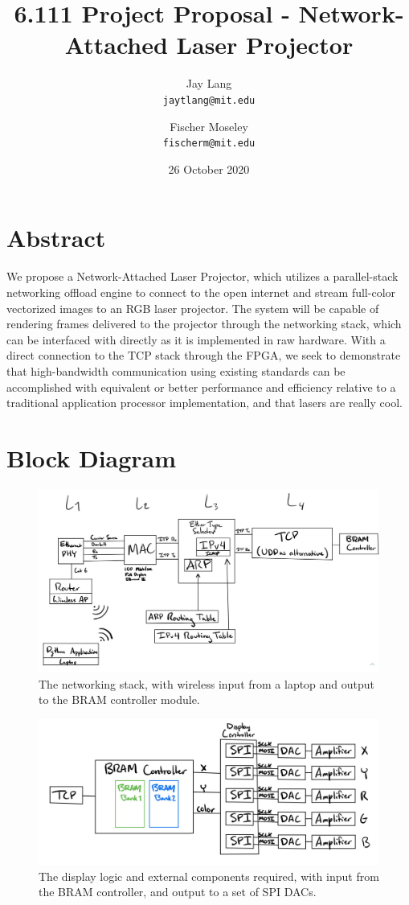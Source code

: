 \documentclass[11pt]{article}
\title{6.111 Project Proposal - Network-Attached Laser Projector}
\author{
  Jay Lang\\
  \texttt{jaytlang@mit.edu}
  \and
  Fischer Moseley\\
  \texttt{fischerm@mit.edu}
}
\date{26 October 2020}
\begin{document}
\maketitle

\section{Abstract}
We propose a Network-Attached Laser Projector, which utilizes
a parallel-stack networking offload engine to connect to the
open internet and stream full-color vectorized images to an RGB
laser projector. The system will be capable of rendering
frames delivered to the projector through the networking stack,
which can be interfaced with directly as it is implemented in
raw hardware. With a direct connection to the TCP stack through the FPGA, we seek to demonstrate that high-bandwidth communication using existing standards can be accomplished with equivalent or better performance and efficiency relative to a traditional application processor implementation, and that lasers are really cool.

\section{Block Diagram}
\begin{figure}[H]
\centering
\includegraphics[width=1\textwidth]{network.jpg}
\caption{The networking stack, with wireless input from a laptop and output to the BRAM controller module.}
\end{figure}

\begin{figure}[H]
\centering
\includegraphics[width=1\textwidth]{laser.jpg}
\caption{The display logic and external components required, with input from the BRAM controller, and output to a set of SPI DACs.}
\end{figure}
\end{document}
